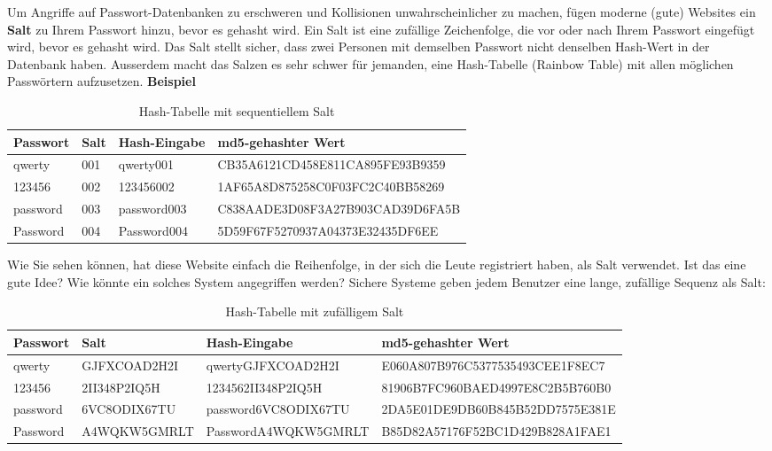 \documentclass[11pt,a4paper]{report}
\begin{document}
Um Angriffe auf Passwort-Datenbanken zu erschweren und Kollisionen unwahrscheinlicher zu machen, fügen moderne (gute) Websites ein \textbf{Salt} zu Ihrem Passwort hinzu, bevor es gehasht wird.
Ein Salt ist eine zufällige Zeichenfolge, die vor oder nach Ihrem Passwort eingefügt wird, bevor es gehasht wird.
Das Salt stellt sicher, dass zwei Personen mit demselben Passwort nicht denselben Hash-Wert in der Datenbank haben.
Ausserdem macht das Salzen es sehr schwer für jemanden, eine Hash-Tabelle (Rainbow Table) mit allen möglichen Passwörtern aufzusetzen.
\textbf{Beispiel}
\begin{table}[h]
\centering
\begin{tabular}{|l|l|l|l|}
\hline
Passwort & Salt & Hash-Eingabe & md5-gehashter Wert \\
\hline
qwerty & 001 & qwerty001 & CB35A6121CD458E811CA895FE93B9359 \\
123456 & 002 & 123456002 & 1AF65A8D875258C0F03FC2C40BB58269 \\
password & 003 & password003 & C838AADE3D08F3A27B903CAD39D6FA5B \\
Password & 004 & Password004 & 5D59F67F5270937A04373E32435DF6EE \\
\hline
\end{tabular}
\caption{Hash-Tabelle mit sequentiellem Salt}
\end{table}


Wie Sie sehen können, hat diese Website einfach die Reihenfolge, in der sich die Leute registriert haben, als Salt verwendet.
Ist das eine gute Idee? Wie könnte ein solches System angegriffen werden?
Sichere Systeme geben jedem Benutzer eine lange, zufällige Sequenz als Salt:

\begin{table}[h]
\scriptsize
\centering
\begin{tabular}{|l|l|l|l|}
\hline
Passwort & Salt & Hash-Eingabe & md5-gehashter Wert \\
\hline
qwerty & GJFXCOAD2H2I & qwertyGJFXCOAD2H2I & E060A807B976C5377535493CEE1F8EC7 \\
123456 & 2II348P2IQ5H & 1234562II348P2IQ5H & 81906B7FC960BAED4997E8C2B5B760B0 \\
password & 6VC8ODIX67TU & password6VC8ODIX67TU & 2DA5E01DE9DB60B845B52DD7575E381E \\
Password & A4WQKW5GMRLT & PasswordA4WQKW5GMRLT & B85D82A57176F52BC1D429B828A1FAE1 \\
\hline
\end{tabular}
\caption{Hash-Tabelle mit zufälligem Salt}
\end{table}
\end{document}
